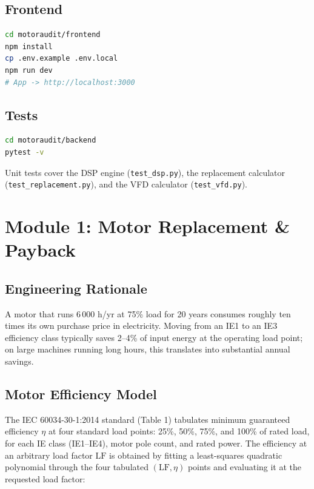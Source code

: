 \documentclass[11pt,a4paper]{article}
\begin{document}
\subsection{Frontend}

\begin{lstlisting}[style=code, language=bash]
cd motoraudit/frontend
npm install
cp .env.example .env.local
npm run dev
# App -> http://localhost:3000
\end{lstlisting}

\subsection{Tests}

\begin{lstlisting}[style=code, language=bash]
cd motoraudit/backend
pytest -v
\end{lstlisting}

Unit tests cover the DSP engine (\texttt{test\_dsp.py}), the replacement
calculator (\texttt{test\_replacement.py}), and the VFD calculator
(\texttt{test\_vfd.py}).

\section{Module 1: Motor Replacement \& Payback}
\label{sec:module1}

\subsection{Engineering Rationale}

A motor that runs 6\,000 h/yr at 75\% load for 20 years consumes roughly ten
times its own purchase price in electricity. Moving from an IE1 to an IE3
efficiency class typically saves 2--4\% of input energy at the operating
load point; on large machines running long hours, this translates into
substantial annual savings.

\subsection{Motor Efficiency Model}

The IEC 60034-30-1:2014 standard (Table 1) tabulates minimum guaranteed
efficiency $\eta$ at four standard load points: 25\%, 50\%, 75\%, and 100\%
of rated load, for each IE class (IE1--IE4), motor pole count, and rated
power. The efficiency at an arbitrary load factor $\mathrm{LF}$ is obtained
by fitting a least-squares quadratic polynomial through the four tabulated
$(\mathrm{LF}, \eta)$ points and evaluating it at the requested load factor:
\end{document}
